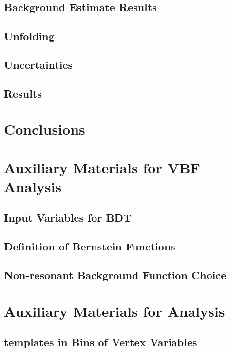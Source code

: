 \documentclass{report}
\begin{document}
\section{Background Estimate Results}

\clearpage

\section{Unfolding}
\label{sec:gbb-unfolding}

\clearpage

\section{Uncertainties}
\label{sec:gbb-systs}



\section{Results}
\label{sec:gbb-results}

\clearpage

\chapter{Conclusions}
\clearpage

\appendix
\chapter{Auxiliary Materials for VBF \Hbb Analysis}
\section{Input Variables for BDT}

\section{Definition of Bernstein Functions}

\section{Non-resonant Background Function Choice}


\chapter{Auxiliary Materials for \gbb Analysis}
\section{\subsdzero templates in Bins of Vertex Variables}

\clearpage
\end{document}
